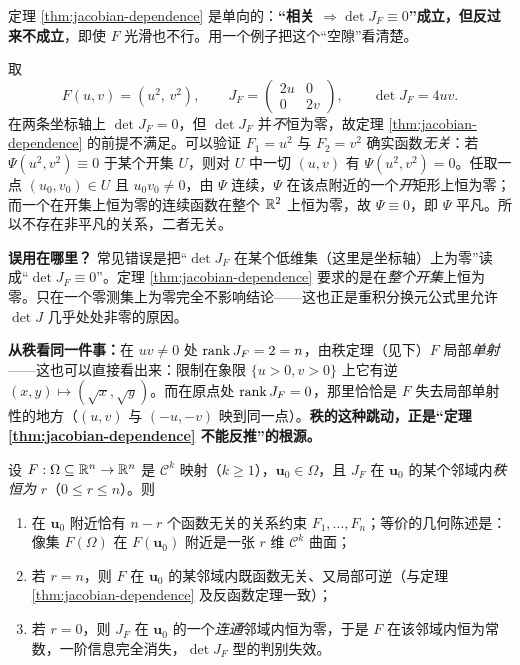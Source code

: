 \begin{remark}
定理 \ref{thm:jacobian-dependence} 是单向的：\textbf{“相关 \(\Rightarrow\det J_F\equiv0\)”成立，但反过来不成立}，即使 \(F\) 光滑也不行。用一个例子把这个“空隙”看清楚。

取
\[
F(u,v)=(u^2,\,v^2),\qquad
J_F=\begin{pmatrix}2u & 0\\ 0 & 2v\end{pmatrix},\qquad
\det J_F=4uv .
\]
在两条坐标轴上 \(\det J_F=0\)，但 \(\det J_F\) 并\emph{不}恒为零，故定理 \ref{thm:jacobian-dependence} 的前提不满足。可以验证 \(F_1=u^2\) 与 \(F_2=v^2\) 确实函数\emph{无关}：若 \(\Psi(u^2,v^2)\equiv0\) 于某个开集 \(U\)，则对 \(U\) 中一切 \((u,v)\) 有 \(\Psi(u^2,v^2)=0\)。任取一点 \((u_0,v_0)\in U\) 且 \(u_0v_0\ne0\)，由 \(\Psi\) 连续，\(\Psi\) 在该点附近的一个\emph{开}矩形上恒为零；而一个在开集上恒为零的连续函数在整个 \(\mathbb{R}^2\) 上恒为零，故 \(\Psi\equiv0\)，即 \(\Psi\) 平凡。所以不存在非平凡的关系，二者无关。

\textbf{误用在哪里？} 常见错误是把“\(\det J_F\) 在某个低维集（这里是坐标轴）上为零”读成“\(\det J_F\equiv0\)”。定理 \ref{thm:jacobian-dependence} 要求的是在\emph{整个开集}上恒为零。只在一个零测集上为零完全不影响结论——这也正是重积分换元公式里允许 \(\det J\) 几乎处处非零的原因。

\textbf{从秩看同一件事：}在 \(uv\ne0\) 处 \(\operatorname{rank} J_F=2=n\)，由秩定理（见下）\(F\) 局部\emph{单射}——这也可以直接看出来：限制在象限 \(\{u>0,v>0\}\) 上它有逆 \((x,y)\mapsto(\sqrt x,\sqrt y)\)。而在原点处 \(\operatorname{rank} J_F=0\)，那里恰恰是 \(F\) 失去局部单射性的地方（\((u,v)\) 与 \((-u,-v)\) 映到同一点）。\textbf{秩的这种跳动，正是“定理 \ref{thm:jacobian-dependence} 不能反推”的根源。}
\end{remark}

\begin{theorem}\label{thm:rank}
设 \(F:\Omega\subseteq\mathbb{R}^n\to\mathbb{R}^n\) 是 \(\mathcal C^k\) 映射（\(k\ge1\)），\(\mathbf u_0\in\Omega\)，且 \(J_F\) 在 \(\mathbf u_0\) 的某个邻域内\emph{秩恒为} \(r\)（\(0\le r\le n\)）。则
\begin{enumerate}[label=(\arabic*)]
  \item 在 \(\mathbf u_0\) 附近恰有 \(n-r\) 个函数无关的关系约束 \(F_1,\dots,F_n\)；等价的几何陈述是：像集 \(F(\Omega)\) 在 \(F(\mathbf u_0)\) 附近是一张 \(r\) 维 \(\mathcal C^k\) 曲面；
  \item 若 \(r=n\)，则 \(F\) 在 \(\mathbf u_0\) 的某邻域内既函数无关、又局部可逆（与定理 \ref{thm:jacobian-dependence} 及反函数定理一致）；
  \item 若 \(r=0\)，则 \(J_F\) 在 \(\mathbf u_0\) 的一个\emph{连通}邻域内恒为零，于是 \(F\) 在该邻域内恒为常数，一阶信息完全消失，\(\det J_F\) 型的判别失效。
\end{enumerate}
\end{theorem}

